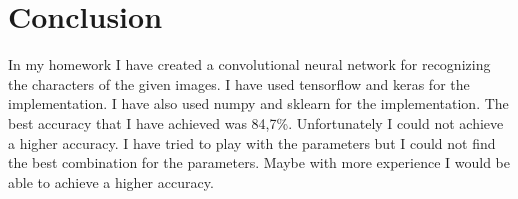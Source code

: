 \documentclass[11pt,a4paper,oneside]{report}
\begin{document}
\chapter{Conclusion}

In my homework I have created a convolutional neural network for recognizing the characters of the given images.
I have used tensorflow and keras for the implementation. I have also used numpy and sklearn for the implementation. The  best accuracy that I have achieved was 84,7\%.
Unfortunately I could not achieve a higher accuracy. I have tried to play with the parameters but I could not find the best combination for the parameters. Maybe with more experience I would be able to achieve a higher accuracy.
\end{document}
